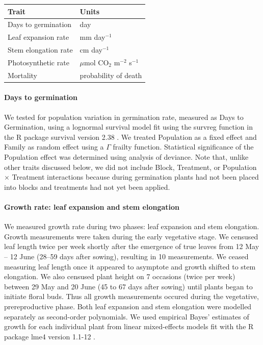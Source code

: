 \documentclass[11pt, oneside]{article}
\newcommand{\pkg}[1]{{\fontseries{b}\selectfont #1}}
\begin{document}
\begin{table}[ht]
   \centering
   \begin{tabular}{@{} ll @{}}
      \toprule
  Trait & Units \\
      \midrule
  Days to germination  & day \\
  Leaf expansion rate  &  mm day$^{-1}$  \\
  Stem elongation rate  &  cm day$^{-1}$  \\
  Photosynthetic rate &  $\mu$mol CO$_2$ m$^{-2}$ s$^{-1}$\\
  Mortality & probability of death  \\
	    \bottomrule
   \end{tabular}
   \label{table:Table_traits}
\end{table}

\paragraph{Days to germination} We tested for population variation in germination rate, measured as Days to Germination, using a lognormal survival model fit using the survreg function in the R package \pkg{survival} version 2.38 \citep{Therneau_2015}. We treated Population as a fixed effect and Family as random effect using a $\Gamma$ frailty function. Statistical significance of the Population effect was determined using analysis of deviance. Note that, unlike other traits discussed below, we did not include Block, Treatment, or Population $\times$ Treatment interactions because during germination plants had not been placed into blocks and treatments had not yet been applied.


\paragraph{Growth rate: leaf expansion and stem elongation}

We measured growth rate during two phases: leaf expansion and stem elongation. Growth measurements were taken during the early vegetative stage. We censused leaf length twice per week shortly after the emergence of true leaves from 12 May -- 12 June (28--59 days after sowing), resulting in 10 measurements. We ceased measuring leaf length once it appeared to asymptote and growth shifted to stem elongation. We also censused plant height on 7 occasions (twice per week) between 29 May and 20 June (45 to 67 days after sowing) until plants began to initiate floral buds. Thus all growth measurements occured during the vegetative, prereproductive phase. Both leaf expansion and stem elongation were modelled separately as second-order polynomials. We used empirical Bayes' estimates of growth for each individual plant from linear mixed-effects models fit with the R package \pkg{lme4} version 1.1-12 \citep{Bates_etal_2015}.
\end{document}
